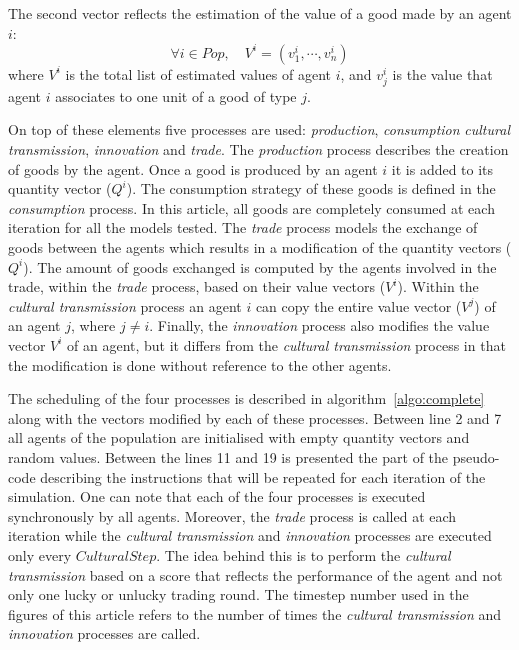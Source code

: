 \documentclass{wscpaperproc}
\begin{document}
The second vector reflects the estimation of the value of a good made by an agent $i$:
$$\forall i \in Pop, \quad V^i = (v^i_1,\cdots,v^i_n) $$
where $V^i$ is the total list of estimated values of agent $i$, and $v^i_j$ is the value that agent $i$ associates to one unit of a good of type $j$.

On top of these elements five processes are used: \emph{production}, \emph{consumption} \emph{cultural transmission}, \emph{innovation} and \emph{trade}. The \emph{production} process describes the creation of goods by the agent. Once a good is produced by an agent $i$ it is added to its quantity vector ($Q^i$). The consumption strategy of these goods is defined in the \emph{consumption} process. In this article, all goods are completely consumed at each iteration for all the models tested. The \emph{trade} process models the exchange of goods between the agents which results in a modification of the quantity vectors ($Q^i$). The amount of goods exchanged is computed by the agents involved in the trade, within the \emph{trade} process, based on their value vectors ($V^i$). Within the \emph{cultural transmission} process an agent $i$ can copy the entire value vector ($V^j$) of an agent $j$, where $j \neq i$. Finally, the \textit{innovation} process also modifies the value vector $V^i$ of an agent, but it differs from the \emph{cultural transmission} process in that the modification is done without reference to the other agents.

The scheduling of the four processes is described in algorithm~\ref{algo:complete} along with the vectors modified by each of these processes. Between line 2 and 7 all agents of the population are initialised with empty quantity vectors and random values. Between the lines 11 and 19 is presented the part of the pseudo-code describing the instructions that will be repeated for each iteration of the simulation. One can note that each of the four processes is executed synchronously by all agents. Moreover, the \emph{trade} process is called at each iteration while the \emph{cultural transmission} and \emph{innovation} processes are executed only every $CulturalStep$. The idea behind this is to perform the \emph{cultural transmission} based on a score that reflects the performance of the agent and not only one lucky or unlucky trading round. The timestep number used in the figures of this article refers to the number of times the \emph{cultural transmission} and \emph{innovation} processes are called.
\end{document}
